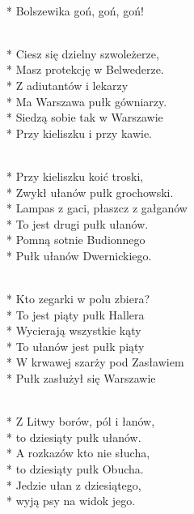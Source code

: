 \begin{lyrics}[longestline={\intertitle{1. Pułk Szwoleżerów J. Piłsudskiego}}]

\begin{chorus}
\\*
Bolszewika goń, goń, goń!
\end{chorus}

\\*
\smallskip
Ciesz się dzielny szwoleżerze,\\*
Masz protekcję w Belwederze.\\*
\medskip
Z adiutantów i lekarzy\\*
Ma Warszawa pułk gówniarzy.\\*
\medskip
Siedzą sobie tak w Warszawie\\*
Przy kieliszku i przy kawie.

\\*
\smallskip
Przy kieliszku koić troski,\\*
Zwykł ułanów pułk grochowski.\\*
\medskip
Lampas z gaci, płaszcz z gałganów\\*
To jest drugi pułk ułanów.\\*
\medskip
Pomną sotnie Budionnego\\*
Pułk ułanów Dwernickiego.

\\*
\smallskip
Kto zegarki w polu zbiera?\\*
To jest piąty pułk Hallera\\*
\medskip
Wycierają wszystkie kąty\\*
To ułanów jest pułk piąty\\*
\medskip
W krwawej szarży pod Zasławiem\\*
Pułk zasłużył się Warszawie

\\*
\smallskip
Z Litwy borów, pól i łanów,\\*
to dziesiąty pułk ułanów.\\*
\medskip
A rozkazów kto nie słucha,\\*
to dziesiąty pułk Obucha.\\*
\medskip
Jedzie ułan z dziesiątego,\\*
wyją psy na widok jego.

\breaklyrics


\end{lyrics}
